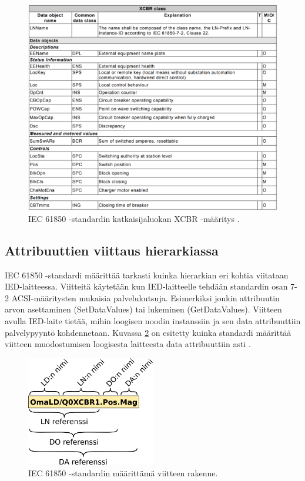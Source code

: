 \begin{figure}
	\includegraphics[width=1\textwidth]{pictures/xcbr-class.png}
	\caption{IEC 61850 -standardin katkaisijaluokan XCBR -määritys \cite[s.~106]{IEC61850-7-4}.}
	\label{fig:xcbr-class}
\end{figure}


\subsection{Attribuuttien viittaus hierarkiassa}
IEC 61850 -standardi määrittää tarkasti kuinka hierarkian eri kohtia viitataan IED-laitteessa. Viitteitä käytetään kun IED-laitteelle tehdään standardin osan 7-2 ACSI-määritysten mukaisia palvelukutsuja. Esimerkiksi jonkin attribuutin arvon asettaminen (SetDataValues) tai lukeminen (GetDataValues). Viitteen avulla IED-laite tietää, mihin loogisen noodin instanssiin ja sen data attribuuttiin palvelypyyntö kohdennetaan. Kuvassa \ref{fig:iec61850-data-reference} on esitetty kuinka standardi määrittää viitteen muodostumisen loogisesta laitteesta data attribuuttiin asti \cite[s.~93]{IEC61850-7-1}.

\begin{figure}
	\includegraphics[width=0.5\textwidth]{pictures/iec61850-data-reference.png}
	\caption{IEC 61850 -standardin määrittämä viitteen rakenne.}
	\label{fig:iec61850-data-reference}
\end{figure}

